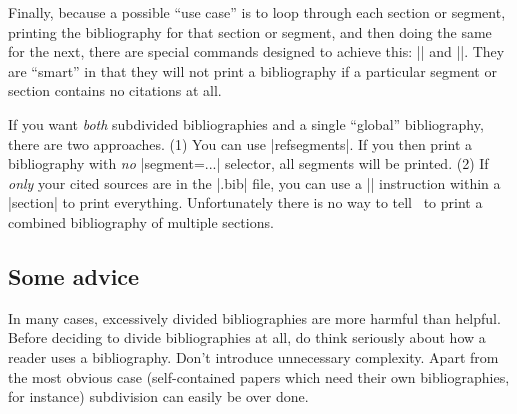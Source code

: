 Finally, because a possible ``use case'' is to loop through each section
or segment, printing the bibliography for that section or segment, and
then doing the same for the next, there are special commands designed to
achieve this: |\bibbysection| and |\bibbysegment|. They are ``smart'' in
that they will not print a bibliography if a particular segment or
section contains no citations at all.

If you want \emph{both} subdivided bibliographies and a single ``global'' bibliography, there are two approaches. (1) You can use |refsegments|. If you then print a bibliography with \emph{no} |segment=...| selector, all segments will be printed. (2) If \emph{only} your cited sources are in the |.bib| file, you can use a |\nocite{*}| instruction within a |section| to print everything. Unfortunately there is no way to tell \biblatex\ to print a combined bibliography of multiple sections.

\subsection{Some advice}

In many cases, excessively divided bibliographies are more harmful than
helpful. Before deciding to divide bibliographies at all, do think
seriously about how a reader uses a bibliography. Don't introduce
unnecessary complexity. Apart from the most obvious case (self-contained
papers which need their own bibliographies, for instance) subdivision
can easily be over done.
